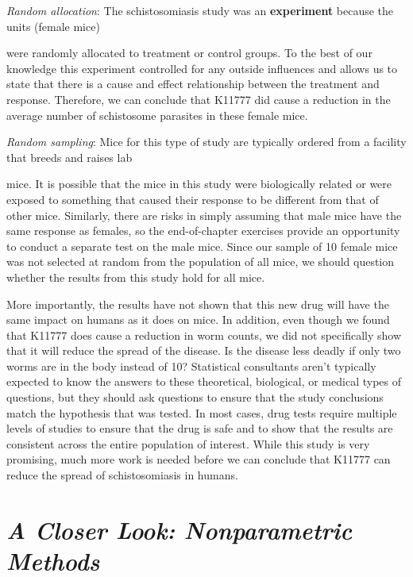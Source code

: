 \documentclass[
]{report}
\begin{document}
\emph{Random allocation}: The schistosomiasis study was an \textbf{experiment} because the units (female mice)

were randomly allocated to treatment or control groups. To the best of our knowledge this experiment
controlled for any outside influences and allows us to state that there is a cause and effect relationship
between the treatment and response. Therefore, we can conclude that K11777 did cause a reduction in
the average number of schistosome parasites in these female mice.

\emph{Random sampling}: Mice for this type of study are typically ordered from a facility that breeds and raises lab

mice. It is possible that the mice in this study were biologically related or were exposed to something that
caused their response to be different from that of other mice. Similarly, there are risks in simply assuming
that male mice have the same response as females, so the end-of-chapter exercises provide an opportunity to conduct a separate test on the male mice. Since our sample of 10 female mice was not selected at random
from the population of all mice, we should question whether the results from this study hold for all mice.

More importantly, the results have not shown that this new drug will have the same impact on humans
as it does on mice. In addition, even though we found that K11777 does cause a reduction in worm counts,
we did not specifically show that it will reduce the spread of the disease. Is the disease less deadly if only two
worms are in the body instead of 10? Statistical consultants aren't typically expected to know the answers to
these theoretical, biological, or medical types of questions, but they should ask questions to ensure that the
study conclusions match the hypothesis that was tested. In most cases, drug tests require multiple levels of
studies to ensure that the drug is safe and to show that the results are consistent across the entire population of
interest. While this study is very promising, much more work is needed before we can conclude that K11777
can reduce the spread of schistosomiasis in humans.

\section*{\texorpdfstring{\emph{A Closer Look: Nonparametric Methods}}{A Closer Look: Nonparametric Methods}}\label{a-closer-look-nonparametric-methods}
\end{document}
